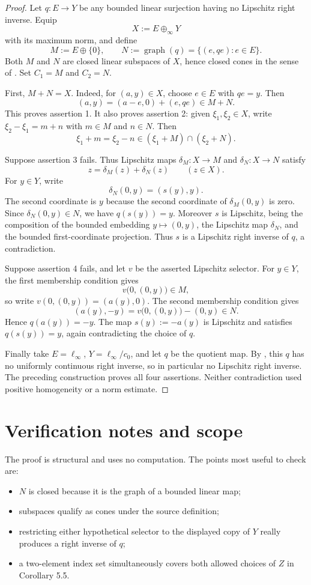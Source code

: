 \documentclass[11pt]{article}
\newcommand{\linf}{\ell_\infty}
\begin{document}
\begin{proof}
Let $q:E\to Y$ be any bounded linear surjection having no Lipschitz right
inverse.  Equip
\[
  X:=E\oplus_\infty Y
\]
with its maximum norm, and define
\[
  M:=E\oplus\{0\},\qquad
  N:=\operatorname{graph}(q)=\{(e,qe):e\in E\}.
\]
Both $M$ and $N$ are closed linear subspaces of $X$, hence closed cones in the
sense of \cite{source}.  Set $C_1=M$ and $C_2=N$.

First, $M+N=X$.  Indeed, for $(a,y)\in X$, choose $e\in E$ with $qe=y$.
Then
\[
  (a,y)=(a-e,0)+(e,qe)\in M+N.
\]
This proves assertion 1.  It also proves assertion 2: given
$\xi_1,\xi_2\in X$, write $\xi_2-\xi_1=m+n$ with $m\in M$ and $n\in N$.
Then
\[
  \xi_1+m=\xi_2-n\in(\xi_1+M)\cap(\xi_2+N).
\]

Suppose assertion 3 fails.  Thus Lipschitz maps $\delta_M:X\to M$ and
$\delta_N:X\to N$ satisfy
\[
  z=\delta_M(z)+\delta_N(z)\qquad(z\in X).
\]
For $y\in Y$, write
\[
  \delta_N(0,y)=(s(y),y).
\]
The second coordinate is $y$ because the second coordinate of
$\delta_M(0,y)$ is zero.  Since $\delta_N(0,y)\in N$, we have $q(s(y))=y$.
Moreover $s$ is Lipschitz, being the composition of the bounded embedding
$y\mapsto(0,y)$, the Lipschitz map $\delta_N$, and the bounded first-coordinate
projection.  Thus $s$ is a Lipschitz right inverse of $q$, a contradiction.

Suppose assertion 4 fails, and let $v$ be the asserted Lipschitz selector.  For
$y\in Y$, the first membership condition gives
\[
  v\bigl(0,(0,y)\bigr)\in M,
\]
so write $v(0,(0,y))=(a(y),0)$.  The second membership condition gives
\[
  (a(y),-y)=v\bigl(0,(0,y)\bigr)-(0,y)\in N.
\]
Hence $q(a(y))=-y$.  The map $s(y):=-a(y)$ is Lipschitz and satisfies
$q(s(y))=y$, again contradicting the choice of $q$.

Finally take $E=\linf$, $Y=\linf/c_0$, and let $q$ be the quotient map.  By
\cite[Proposition~2.5]{quotient}, this $q$ has no uniformly continuous right
inverse, so in particular no Lipschitz right inverse.  The preceding
construction proves all four assertions.  Neither contradiction used positive
homogeneity or a norm estimate.
\end{proof}

\section{Verification notes and scope}

The proof is structural and uses no computation.  The points most useful to
check are:
\begin{itemize}
  \item $N$ is closed because it is the graph of a bounded linear map;
  \item subspaces qualify as cones under the source definition;
  \item restricting either hypothetical selector to the displayed copy of
  $Y$ really produces a right inverse of $q$;
  \item a two-element index set simultaneously covers both allowed choices of
  $Z$ in Corollary 5.5.
\end{itemize}
\end{document}
